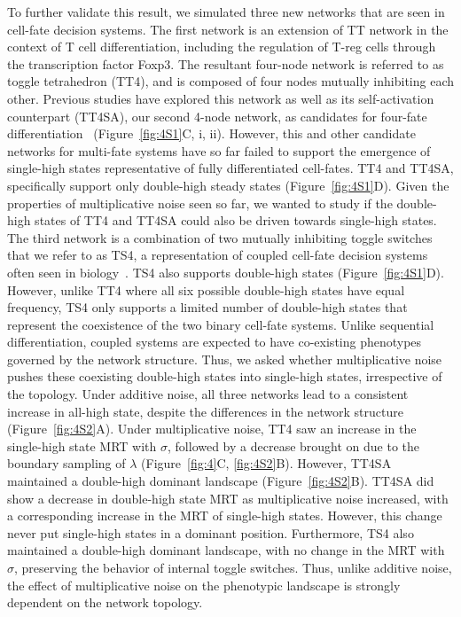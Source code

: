 \documentclass[11pt]{article}
\begin{document}
To further validate this result, we simulated three new networks that are seen in cell-fate decision systems. The first network is an extension of TT network in the context of T cell differentiation, including the regulation of T-reg cells through the transcription factor Foxp3. The resultant four-node network is referred to as toggle tetrahedron (TT4), and is composed of four nodes mutually inhibiting each other. Previous studies have explored this network as well as its self-activation counterpart (TT4SA), our second 4-node network, as candidates for four-fate differentiation~\cite{Duddu2024MultistabilityDifferentiation} (Figure~\ref{fig:4S1}C, i, ii). However, this and other candidate networks for multi-fate systems have so far failed to support the emergence of single-high states representative of fully differentiated cell-fates. TT4 and TT4SA, specifically support only double-high steady states (Figure~\ref{fig:4S1}D). Given the properties of multiplicative noise seen so far, we wanted to study if the double-high states of TT4 and TT4SA could also be driven towards single-high states. The third network is a combination of two mutually inhibiting toggle switches that we refer to as TS4, a representation of coupled cell-fate decision systems often seen in biology~\cite{pasani2020hybrid, hari2022emergent}. TS4 also supports double-high states (Figure~\ref{fig:4S1}D). However, unlike TT4 where all six possible double-high states have equal frequency, TS4 only supports a limited number of double-high states that represent the coexistence of the two binary cell-fate systems. Unlike sequential differentiation, coupled systems are expected to have co-existing phenotypes governed by the network structure. Thus, we asked whether multiplicative noise pushes these coexisting double-high states into single-high states, irrespective of the topology. Under additive noise, all three networks lead to a consistent increase in all-high state, despite the differences in the network structure (Figure~\ref{fig:4S2}A). Under multiplicative noise, TT4 saw an increase in the single-high state MRT with $\sigma$, followed by a decrease brought on due to the boundary sampling of $\lambda$ (Figure~\ref{fig:4}C, \ref{fig:4S2}B). However, TT4SA maintained a double-high dominant landscape (Figure~\ref{fig:4S2}B). TT4SA did show a decrease in double-high state MRT as multiplicative noise increased, with a corresponding increase in the MRT of single-high states. However, this change never put single-high states in a dominant position. Furthermore, TS4 also maintained a double-high dominant landscape, with no change in the MRT with $\sigma$, preserving the behavior of internal toggle switches. Thus, unlike additive noise, the effect of multiplicative noise on the phenotypic landscape is strongly dependent on the network topology. 
\end{document}
